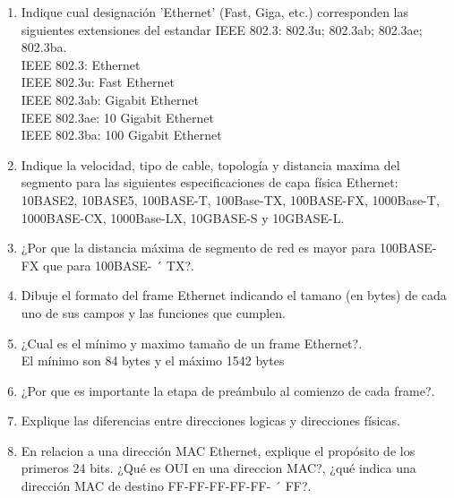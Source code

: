 \documentclass{udparticle}
\begin{document}
\begin{enumerate}
\item Indique cual designación 'Ethernet' (Fast, Giga, etc.) corresponden las siguientes extensiones
del estandar IEEE 802.3: 802.3u; 802.3ab; 802.3ae; 802.3ba.\\
    IEEE 802.3: Ethernet\\
    IEEE   802.3u: Fast Ethernet\\
    IEEE  802.3ab: Gigabit Ethernet\\
    IEEE 802.3ae: 10 Gigabit Ethernet\\
    IEEE 802.3ba: 100 Gigabit Ethernet\\
    
\item Indique la velocidad, tipo de cable, topología y distancia maxima del segmento para las 
siguientes especificaciones de capa física Ethernet: 10BASE2, 10BASE5, 100BASE-T, 100Base-TX,
100BASE-FX, 1000Base-T, 1000BASE-CX, 1000Base-LX, 10GBASE-S y 10GBASE-L.\\

\item ¿Por que la distancia máxima de segmento de red es mayor para 100BASE-FX que para 100BASE- ´
TX?.\\

\item Dibuje el formato del frame Ethernet indicando el tamano (en bytes) de cada uno de sus campos
y las funciones que cumplen.\\

\item ¿Cual es el mínimo y maximo tamaño de un frame Ethernet?.\\
    El mínimo son 84 bytes y el máximo 1542 bytes
\item ¿Por que es importante la etapa de preámbulo al comienzo de cada frame?.\\

\item Explique las diferencias entre direcciones logicas y direcciones físicas.

\item En relacion a una dirección MAC Ethernet, explique el propósito de los primeros 24 bits. ¿Qué
es OUI en una direccion MAC?, ¿qué indica una dirección MAC de destino FF-FF-FF-FF-FF- ´
FF?.\\

\end{enumerate}
\end{document}
